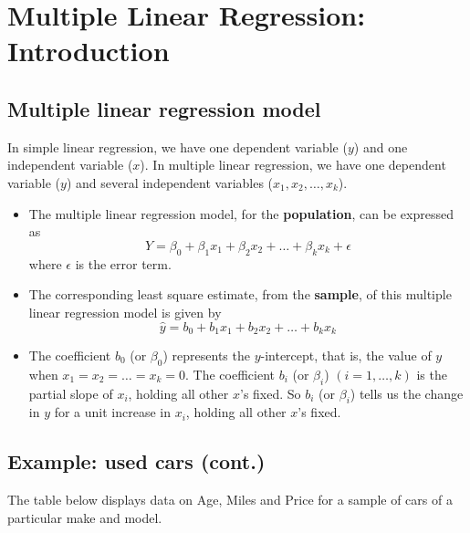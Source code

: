 \documentclass[
]{article}
\author{}
\date{\vspace{-2.5em}}
\begin{document}
\hypertarget{multiple-linear-regression-introduction}{%
\section{Multiple Linear Regression:
Introduction}\label{multiple-linear-regression-introduction}}

\hypertarget{multiple-linear-regression-model}{%
\subsection{Multiple linear regression
model}\label{multiple-linear-regression-model}}

In simple linear regression, we have one dependent variable (\(y\)) and
one independent variable (\(x\)). In multiple linear regression, we have
one dependent variable (\(y\)) and several independent variables
(\(x_1,x_2, \ldots,x_k\)).

\begin{itemize}
\item
  The multiple linear regression model, for the \textbf{population}, can
  be expressed as
  \[Y=\beta_0+\beta_1 x_1 +\beta_2 x_2+\ldots+\beta_kx_k+ \epsilon\]
  where \(\epsilon\) is the error term.
\item
  The corresponding least square estimate, from the \textbf{sample}, of
  this multiple linear regression model is given by
  \[\hat{y}=b_0+b_1 x_1+b_2 x_2+\ldots+b_k x_k\]
\item
  The coefficient \(b_0\) (or \(\beta_0\)) represents the
  \(y\)-intercept, that is, the value of \(y\) when
  \(x_1=x_2= \ldots=x_k=0\). The coefficient \(b_i\) (or \(\beta_i\))
  \((i=1, \ldots, k)\) is the partial slope of \(x_i\), holding all
  other \(x\)'s fixed. So \(b_i\) (or \(\beta_i\)) tells us the change
  in \(y\) for a unit increase in \(x_i\), holding all other \(x\)'s
  fixed.
\end{itemize}

\hypertarget{example-used-cars-cont.}{%
\subsection{Example: used cars (cont.)}\label{example-used-cars-cont.}}

The table below displays data on Age, Miles and Price for a sample of
cars of a particular make and model.
\end{document}
